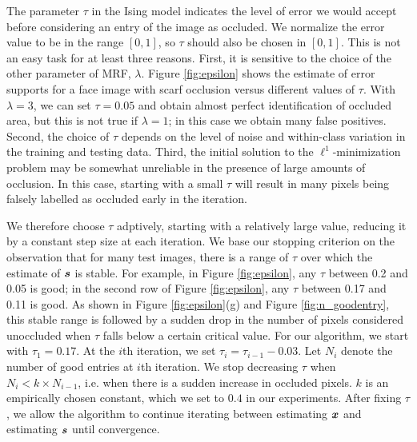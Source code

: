 The parameter $\tau$ in the Ising model indicates the level
of error we would accept before considering an entry of the image as occluded. We
normalize the error value to be in the range $[0,1]$, so $\tau$
should also be chosen in $[0,1]$. This is not an easy
task for at least three reasons. First, it is sensitive to the
choice of the other parameter of MRF, $\lambda$. Figure
\ref{fig:epsilon} shows the estimate of error supports for a face
image with scarf occlusion versus different values of $\tau$.
With $\lambda = 3$, we can set $\tau=0.05$ and obtain almost perfect
identification of occluded area, but this is not true if $\lambda =
1$; in this case we obtain many false positives. Second, the choice of
$\tau$ depends on the level of noise and within-class variation in the
training and testing data. Third, the initial solution to
the $\ell^1$-minimization problem may be somewhat unreliable in the
presence of large amounts of occlusion.
In this case, starting with a small $\tau$ will result in many pixels being
falsely labelled as occluded early in the iteration.

We therefore choose $\tau$ adptively, starting with a
relatively large value, reducing it by a constant step size
at each iteration. We base our stopping criterion on the observation that for many test images, there is a
range of $\tau$ over which the estimate of $\boldsymbol{s}$ is stable.
For example, in Figure \ref{fig:epsilon}, any $\tau$ between 0.2 and 0.05 is good; in
the second row of Figure \ref{fig:epsilon}, any $\tau$ between
0.17 and 0.11 is good. As shown in Figure \ref{fig:epsilon}(g) and
Figure \ref{fig:n_goodentry}, this stable range is followed by a sudden drop in the
number of pixels considered unoccluded when $\tau$ falls below a certain critical value.
For our algorithm, we start with $\tau_1 = 0.17$. At the $i$th
iteration, we set $\tau_i = \tau_{i-1}-0.03$. Let $N_i$
denote the number of good entries at $i$th iteration. We stop
decreasing $\tau$ when $N_i < k \times N_{i-1}$, i.e. when there is a sudden increase in occluded pixels.  $k$ is an
empirically chosen constant, which we set to $0.4$ in our experiments.
After fixing $\tau$, we allow the algorithm to continue iterating
between estimating ${\boldsymbol{x}}$ and estimating $\boldsymbol{s}$ until convergence.

